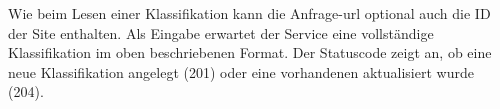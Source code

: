     Wie beim Lesen einer Klassifikation kann die Anfrage-\gls{url} optional auch die ID der Site enthalten.
    Als Eingabe erwartet der Service eine vollständige Klassifikation im oben beschriebenen Format.
    Der Statuscode zeigt an, ob eine neue Klassifikation angelegt (201) oder eine vorhandenen aktualisiert wurde (204).
